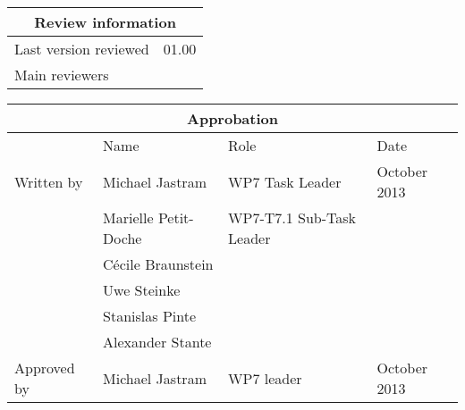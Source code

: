 \documentclass{template/openetcs_report}
\begin{document}
\begin{tabular}{|p{4.4cm}|p{8.7cm}|}
\hline
\multicolumn{2}{|c|}{Review information} \\
\hline
Last version reviewed & 01.00 \\
\hline
Main reviewers &  \\
\hline
\end{tabular}

\begin{tabular}{|p{2.2cm}|p{4cm}|p{4cm}|p{2cm}|}
\hline
\multicolumn{4}{|c|}{Approbation} \\
\hline
  &  Name & Role & Date   \\
\hline  
Written by  & Michael Jastram & WP7 Task Leader  &  October 2013 \\
&  Marielle Petit-Doche & WP7-T7.1 Sub-Task Leader  & \\
& Cécile Braunstein & &  \\
& Uwe Steinke & &  \\
& Stanislas Pinte & &  \\
& Alexander Stante & &  \\
\hline
Approved by & Michael Jastram & WP7 leader & October 2013 \\
\hline
\end{tabular}
\end{document}
